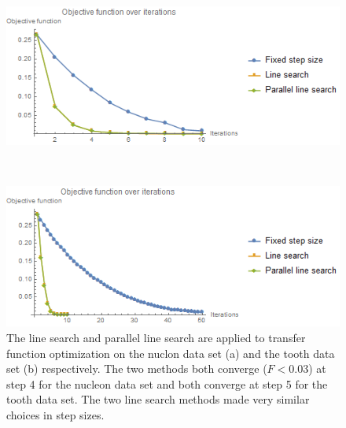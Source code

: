 \begin{figure}
	\centering
	\begin{minipage}{.49\textwidth}
		\includegraphics[width=1\linewidth]{images/nucleon_naive_rms_fixed_linesearch_parallel}
		\subcaption{}
	\end{minipage}~
	\begin{minipage}{.49\textwidth}
		\includegraphics[width=1\linewidth]{images/tooth_naive_rms_fixed_linesearch_parallel}
		\subcaption{}
	\end{minipage}
	\caption[The line search and parallel line search are applied to transfer function optimization on the nuclon data set and the tooth data set respectively.]{The line search and parallel line search are applied to transfer function optimization on the nuclon data set (a) and the tooth data set (b) respectively. The two methods both converge ($F<0.03$) at step 4 for the nucleon data set and both converge at step 5 for the tooth data set. The two line search methods made very similar choices in step sizes.}
	\label{fig:nucleon_naive_tooth_naive_rms_linesearch}
\end{figure}

